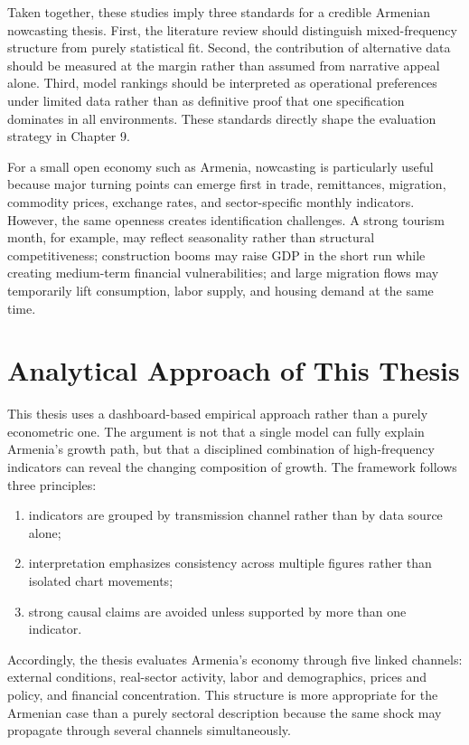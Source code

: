 \documentclass[12pt,a4paper]{report}
\begin{document}
Taken together, these studies imply three standards for a credible Armenian nowcasting thesis. First, the literature review should distinguish mixed-frequency structure from purely statistical fit. Second, the contribution of alternative data should be measured at the margin rather than assumed from narrative appeal alone. Third, model rankings should be interpreted as operational preferences under limited data rather than as definitive proof that one specification dominates in all environments. These standards directly shape the evaluation strategy in Chapter 9.

For a small open economy such as Armenia, nowcasting is particularly useful because major turning points can emerge first in trade, remittances, migration, commodity prices, exchange rates, and sector-specific monthly indicators. However, the same openness creates identification challenges. A strong tourism month, for example, may reflect seasonality rather than structural competitiveness; construction booms may raise GDP in the short run while creating medium-term financial vulnerabilities; and large migration flows may temporarily lift consumption, labor supply, and housing demand at the same time.

\section{Analytical Approach of This Thesis}
This thesis uses a dashboard-based empirical approach rather than a purely econometric one. The argument is not that a single model can fully explain Armenia's growth path, but that a disciplined combination of high-frequency indicators can reveal the changing composition of growth. The framework follows three principles:
\begin{enumerate}
    \item indicators are grouped by transmission channel rather than by data source alone;
    \item interpretation emphasizes consistency across multiple figures rather than isolated chart movements;
    \item strong causal claims are avoided unless supported by more than one indicator.
\end{enumerate}

Accordingly, the thesis evaluates Armenia's economy through five linked channels: external conditions, real-sector activity, labor and demographics, prices and policy, and financial concentration. This structure is more appropriate for the Armenian case than a purely sectoral description because the same shock may propagate through several channels simultaneously.
\end{document}
